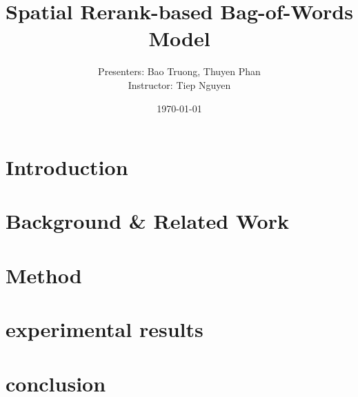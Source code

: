 \documentclass[10pt, compress]{beamer}
\title{Spatial Rerank-based Bag-of-Words Model}
\subtitle{}
\date{\today}
\author{Presenters: Bao Truong, Thuyen Phan
\\Instructor: Tiep Nguyen}
\institute{VNUHCM - University of Science - Faculty of Information Technology}
\begin{document}
\maketitle



\section{Introduction}



\section{Background \& Related Work}



\section{Method}





\section{experimental results}



\section{conclusion}



\end{document}
